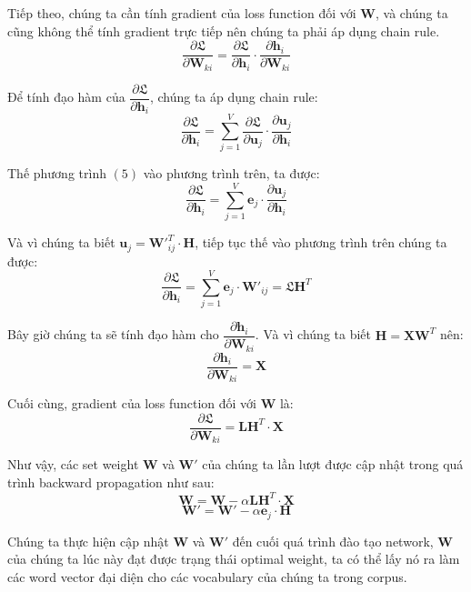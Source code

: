 \documentclass[12pt]{article}
\begin{document}
\indent Tiếp theo, chúng ta cần tính gradient của loss function đối với $\boldsymbol{W}$, và chúng ta cũng không thể tính gradient trực tiếp nên chúng ta phải áp dụng chain rule.
$$\dfrac{\partial \mathfrak{L}}{\partial \boldsymbol{W}_{ki}} = \dfrac{\partial \mathfrak{L}}{\partial \boldsymbol{h}_i} \cdot \dfrac{\partial \boldsymbol{h}_i}{\partial \boldsymbol{W}_{ki}}$$

\indent Để tính đạo hàm của $\dfrac{\partial \mathfrak{L}}{\partial \boldsymbol{h}_i}$, chúng ta áp dụng chain rule:
$$\dfrac{\partial \mathfrak{L}}{\partial \boldsymbol{h}_i} = \sum_{j=1}^V \dfrac{\partial \mathfrak{L}}{\partial \boldsymbol{u}_j} \cdot \dfrac{\partial \boldsymbol{u}_j}{\partial \boldsymbol{h}_i}$$

\indent Thế phương trình $(5)$ vào phương trình trên, ta được:
$$\dfrac{\partial \mathfrak{L}}{\partial \boldsymbol{h}_i} = \sum_{j=1}^V \boldsymbol{e}_j \cdot \dfrac{\partial \boldsymbol{u}_j}{\partial \boldsymbol{h}_i}$$

\indent Và vì chúng ta biết $\boldsymbol{u}_j = \boldsymbol{W'}_{ij}^T \cdot \boldsymbol{H}$, tiếp tục thế vào phương trình trên chúng ta được:
$$\dfrac{\partial \mathfrak{L}}{\partial \boldsymbol{h}_i} = \sum_{j=1}^V \boldsymbol{e}_j \cdot \boldsymbol{W'}_{ij} = \mathfrak{L}\boldsymbol{H}^T$$

\indent Bây giờ chúng ta sẽ tính đạo hàm cho $\dfrac{\partial \boldsymbol{h}_i}{\partial \boldsymbol{W}_{ki}}$. Và vì chúng ta biết $\boldsymbol{H} = \boldsymbol{XW}^T$ nên:
$$\dfrac{\partial \boldsymbol{h}_i}{\partial \boldsymbol{W}_{ki}} = \boldsymbol{X}$$

\indent Cuối cùng, gradient của loss function đối với $\boldsymbol{W}$ là:
$$\dfrac{\partial \mathfrak{L}}{\partial \boldsymbol{W}_{ki}} = \boldsymbol{LH}^T \cdot \boldsymbol{X}$$

\indent Như vậy, các set weight $\boldsymbol{W}$ và $\boldsymbol{W'}$ của chúng ta lần lượt được cập nhật trong quá trình backward propagation như sau:
$$\boldsymbol{W} = \boldsymbol{W} - \alpha \boldsymbol{LH}^T \cdot \boldsymbol{X}$$
$$\boldsymbol{W'} = \boldsymbol{W'} - \alpha \boldsymbol{e}_j \cdot \boldsymbol{H}$$

\indent Chúng ta thực hiện cập nhật $\boldsymbol{W}$ và $\boldsymbol{W'}$ đến cuối quá trình đào tạo network, $\boldsymbol{W}$ của chúng ta lúc này đạt được trạng thái optimal weight, ta có thể lấy nó ra làm các word vector đại diện cho các vocabulary của chúng ta trong corpus.
\end{document}
